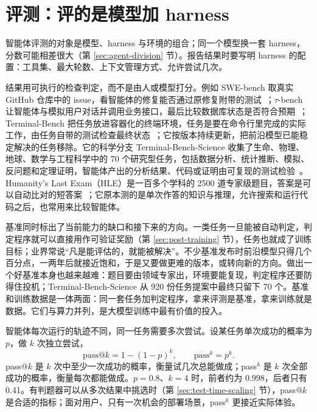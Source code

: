 \section{评测：评的是模型加 harness}
\label{sec:agent-eval}

智能体评测的对象是模型、harness 与环境的组合；同一个模型换一套 harness，分数可能相差很大（第 \ref{sec:agent-division} 节）。报告结果时要写明 harness 的配置：工具集、最大轮数、上下文管理方式、允许尝试几次。

结果用可执行的检查判定，而不是由人或模型打分。例如 SWE-bench 取真实 GitHub 仓库中的 issue，看智能体的修复能否通过原修复附带的测试~\cite{jimenez2024swebench}；\(\tau\)-bench 让智能体与模拟用户对话并调用业务接口，最后比较数据库状态是否符合预期~\cite{yao2024taubench}；Terminal-Bench 把任务放进容器化的终端环境，任务是要在命令行里完成的实际工作，由任务自带的测试检查最终状态~\cite{merrill2026terminalbench}；它按版本持续更新，把前沿模型已能稳定解决的任务移除。它的科学分支 Terminal-Bench-Science 收集了生命、物理、地球、数学与工程科学中的 70 个研究型任务，包括数据分析、统计推断、模拟、反问题和定理证明，智能体产出的分析结果、代码或证明由可复现的测试检验~\cite{tbenchscience}。Humanity's Last Exam（HLE）是一百多个学科的 2500 道专家级题目，答案是可以自动比对的短答案~\cite{phan2026hle}；它原本测的是单次作答的知识与推理，允许搜索和运行代码之后，也常用来比较智能体。

基准同时标出了当前能力的缺口和接下来的方向。一类任务一旦能被自动判定，判定程序就可以直接用作可验证奖励（第 \ref{sec:post-training} 节），任务也就成了训练目标；业界常说“凡是能评估的，就能被解决”。不少基准发布时前沿模型只得几个百分点，一两年后就接近饱和，于是又要做更难的版本，或转向新的方向。做出一个好基准本身也越来越难：题目要由领域专家出，环境要能复现，判定程序还要防得住投机；Terminal-Bench-Science 从 920 份任务提案中最终只留下 70 个。基准和训练数据是一体两面：同一套任务加判定程序，拿来评测是基准，拿来训练就是数据。它们与算力并列，是大模型训练中最有价值的投入。

智能体每次运行的轨迹不同，同一任务需要多次尝试。设某任务单次成功的概率为 \(p\)，做 \(k\) 次独立尝试，
\begin{equation}
 \text{pass@}k=1-(1-p)^k,\qquad \text{pass}^k=p^k.
\end{equation}
pass@\(k\) 是 \(k\) 次中至少一次成功的概率，衡量试几次总能做成；pass\(^k\) 是 \(k\) 次全部成功的概率，衡量每次都能做成。\(p=0.8\)、\(k=4\) 时，前者约为 0.998，后者只有 0.41。有判题器可以从多次结果中挑选时（第 \ref{sec:test-time-scaling} 节），pass@\(k\) 是合适的指标；面对用户、只有一次机会的部署场景，pass\(^k\) 更接近实际体验。

